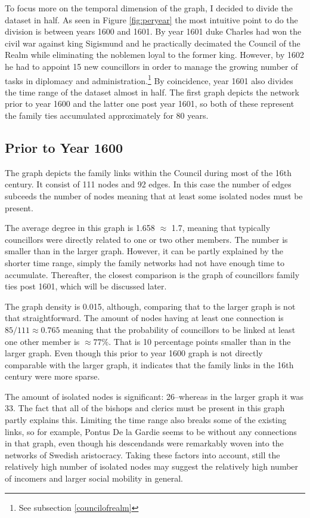To focus more on the temporal dimension of the graph, I decided to divide the dataset in half. As seen in Figure \ref{fig:peryear} the most intuitive point to do the division is between years 1600 and 1601. By year 1601 duke Charles had won the civil war against king Sigismund and he practically decimated the Council of the Realm while eliminating the noblemen loyal to the former king. However, by 1602 he had to appoint 15 new councillors in order to manage the growing number of tasks in diplomacy and administration.\footnote{See subsection \ref{councilofrealm}} By coincidence, year 1601 also divides the time range of the dataset almost in half. The first graph depicts the network prior to year 1600 and the latter one post year 1601, so both of these represent the family ties accumulated approximately for 80 years.

\subsection{Prior to Year 1600}
The graph depicts the family links within the Council during most of the 16th century. It consist of 111 nodes and 92 edges. In this case the number of edges subceeds the number of nodes meaning that at least some isolated nodes must be present. 

The average degree in this graph is 1.658 $\approx$ 1.7, meaning that typically councillors were directly related to one or two other members. The number is smaller than in the larger graph. However, it can be partly explained by the shorter time range, simply the family networks had not have enough time to accumulate. Thereafter, the closest comparison is the graph of councillors family ties post 1601, which will be discussed later.

The graph density is 0.015, although, comparing that to the larger graph is not that straightforward. The amount of nodes having at least one connection is $85/111 \approx 0.765$ meaning that the probability of councillors to be linked at least one other member is $\approx 77\%$. That is 10 percentage points smaller than in the larger graph. Even though this prior to year 1600 graph is not directly comparable with the larger graph, it indicates that the family links in the 16th century were more sparse.

The amount of isolated nodes is significant: 26–whereas in the larger graph it was 33. The fact that all of the bishops and clerics must be present in this graph partly explains this. Limiting the time range also breaks some of the existing links, so for example, Pontus De la Gardie seems to be without any connections in that graph, even though his descendands were remarkably woven into the networks of Swedish aristocracy. Taking these factors into account, still the relatively high number of isolated nodes may suggest the relatively high number of incomers and larger social mobility in general.

